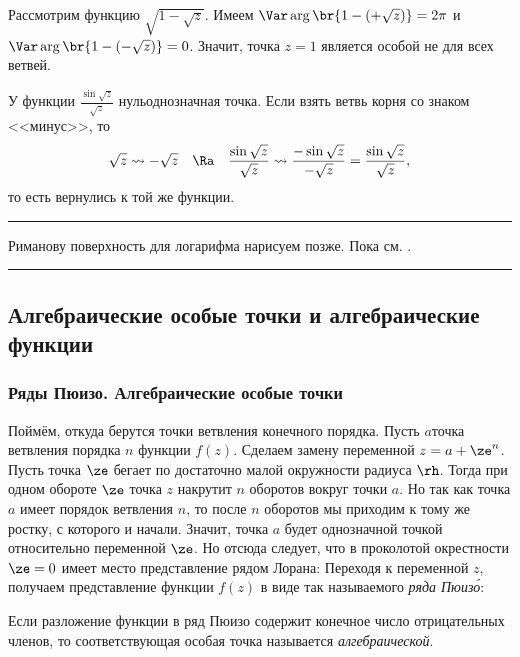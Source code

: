 \documentclass[a4paper]{article}
\newenvironment{petit}
{\par \smallskip \hrule \smallskip \footnotesize}
{\par \smallskip \hrule \smallskip}
\begin{document}
\begin{ex}
Рассмотрим функцию $\sqrt{1-\sqrt{z}}$.
Имеем $\Var\arg \br{1- (+\sqrt z)}=2\pi$ и $\Var\arg \br{1-(-\sqrt z)}=0$. Значит, точка $z=1$ является особой
не для всех ветвей.
\end{ex}

\begin{ex} У функции $\frac{\sin\sqrt{z}}{\sqrt{z}}$ нуль\т однозначная точка. Если взять ветвь корня со знаком <<минус>>, то
$$\sqrt{z} \rightsquigarrow -\sqrt{z} \quad \Ra \quad
\frac{\sin\sqrt{z}}{\sqrt{z}} \rightsquigarrow \frac{-\sin\sqrt z }{-\sqrt z}=\frac{\sin\sqrt z}{\sqrt z},$$
то есть вернулись к той же функции.
\end{ex}

\begin{petit}
Риманову поверхность для логарифма нарисуем позже. Пока см. \cite[стр. 195]{shabat}.
\end{petit}

\subsection{Алгебраические особые точки и алгебраические функции}

\subsubsection{Ряды Пюизо. Алгебраические особые точки}

Поймём, откуда берутся точки ветвления конечного порядка.
Пусть $a$\т точка ветвления порядка $n$ функции $f(z)$. Сделаем замену переменной
$z = a + \ze^n$. Пусть точка $\ze$ бегает по достаточно малой окружности радиуса $\rh$.
Тогда при одном обороте $\ze$ точка $z$ накрутит $n$ оборотов вокруг точки $a$.
Но так как точка $a$ имеет порядок ветвления $n$, то после $n$ оборотов мы приходим к тому же
ростку, с которого и начали. Значит, точка $a$ будет однозначной точкой относительно переменной
$\ze$. Но отсюда следует, что в проколотой окрестности $\ze = 0$ имеет место представление рядом Лорана:
Переходя к переменной $z$, получаем представление функции $f(z)$ в виде так называемого \emph{ряда Пюиз\'о}:

\begin{df}
Если разложение функции в ряд Пюизо содержит конечное число отрицательных членов, то
соответствующая особая точка называется \emph{алгебраической}.
\end{df}
\end{document}
